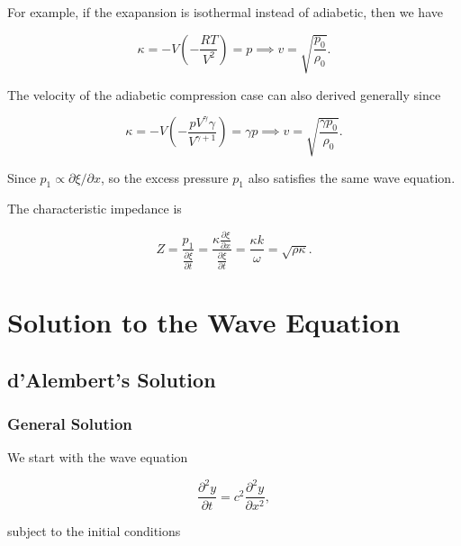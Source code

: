\documentclass[a4paper,12pt]{report}
\begin{document}
For example, if the exapansion is isothermal instead of adiabetic, then we have

\begin{equation}
	\kappa = -V \left( -\frac{RT}{V^2}  \right) = p \implies v = \sqrt{\frac{p_0 }{\rho _{0} } }. 
\end{equation}

The velocity of the adiabetic compression case can also derived generally since 

\begin{equation}
	\kappa = -V \left( -\frac{pV^{\gamma }\gamma  }{V^{\gamma +1} }  \right) = \gamma p \implies v = \sqrt{\frac{\gamma p_0 }{\rho _{0} } }. 
\end{equation}



Since \(p_1 \propto \partial \xi /\partial x\), so the excess pressure \(p_1 \) also satisfies the same wave equation.  

The characteristic impedance is 

\begin{equation}
	Z = \frac{p_1 }{\frac{\partial \xi }{\partial t} } = \frac{\kappa \frac{\partial \xi }{\partial x} }{\frac{\partial \xi }{\partial t} } = \frac{\kappa k}{\omega } = \sqrt{\rho \kappa }.     
\end{equation}






\section{Solution to the Wave Equation}

\subsection{d'Alembert's Solution}

\subsubsection{General Solution}

We start with the wave equation 

\begin{equation}
	\frac{\partial^2 y}{\partial t} = c^2 \frac{\partial^2 y}{\partial x^2}, \label{waveequation} 
\end{equation}

subject to the initial conditions 
\end{document}
